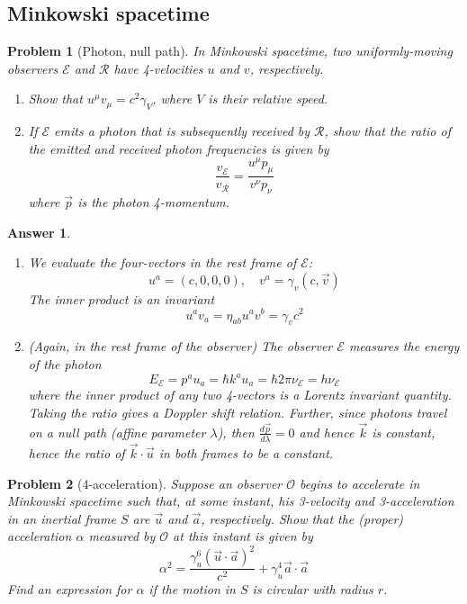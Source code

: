 \documentclass[a4paper]{article}
\theoremstyle{new2}
\newtheorem{ans}{Answer}[section]
\theoremstyle{new}
\newtheorem{qns}{Problem}[section]
\begin{document}
\newpage
\subsection*{Minkowski spacetime}
\begin{qns}[Photon, null path]
In Minkowski spacetime, two uniformly-moving observers $\mathcal{E}$ and $\mathcal{R}$ have 4-velocities $u$ and $v$, respectively.
\begin{enumerate}[label=(\alph*)]
\item  Show that $u^\mu v_\mu=c^2\gamma_V$, where $V$ is their relative speed.
\item  If $\mathcal{E}$ emits a photon that is subsequently received by $\mathcal{R}$, show that the ratio of the emitted and received photon frequencies is given by
$$\frac{v_{\mathcal{E}}}{v_{\mathcal{R}}}=\frac{u^\mu p_\mu}{v^\nu p_\nu}$$
where $\vec{p}$ is the photon 4-momentum.
\end{enumerate}
\end{qns}
\begin{ans}\leavevmode
\begin{enumerate}[label=(\alph*)]
\item We evaluate the four-vectors in the rest frame of $\mathcal{E}$:
$$u^a=(c,0,0,0),\quad v^a=\gamma_v(c,\vec{v})$$
The inner product is an invariant
$$u^av_a=\eta_{ab}u^av^b=\gamma_vc^2$$
\item (Again, in the rest frame of the observer) The observer $\mathcal{E}$ measures the energy of the photon
$$E_\mathcal{E}=p^au_a=\hbar k^au_a=\hbar 2\pi\nu_\mathcal{E}=h\nu_{\mathcal{E}}$$
where the inner product of any two 4-vectors is a Lorentz invariant quantity. Taking the ratio gives a Doppler shift relation. Further, since photons travel on a null path (affine parameter $\lambda$), then $\frac{d\vec{p}}{d\lambda}=0$ and hence $\vec{k}$ is constant, hence the ratio of $\vec{k}\cdot\vec{u}$ in both frames to be a constant.
\end{enumerate}
\end{ans}
\begin{qns}[4-acceleration]
Suppose an observer $\mathcal{O}$ begins to accelerate in Minkowski spacetime such that, at some instant, his 3-velocity and 3-acceleration in an inertial frame $S$ are $\vec{u}$ and $\vec{a}$, respectively. Show that the (proper) acceleration $\alpha$ measured by $\mathcal{O}$ at this instant is given by
$$\alpha^2=\frac{\gamma_u^6(\vec{u}\cdot\vec{a})^2}{c^2}+\gamma_u^4\vec{a}\cdot\vec{a}$$
Find an expression for $\alpha$ if the motion in $S$ is circular with radius $r$. 
\end{qns}
\end{document}
